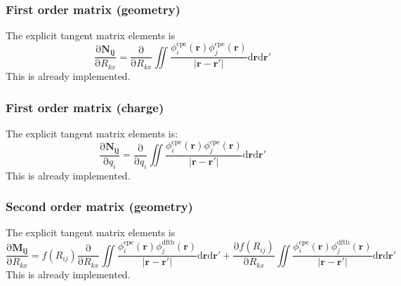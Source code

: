 \documentclass{article}
\numberwithin{equation}{section}
\begin{document}
\subsubsection{First order matrix (geometry)}
The explicit tangent matrix elements is
\begin{equation}
    \frac{\mathrm{\partial}\mathbf{N_{ij}}}{\mathrm{\partial}R_{kx}} =
    \frac{\mathrm{\partial}}{\mathrm{\partial}R_{kx}}  \iint \frac{\phi_i^\mathrm{cpe}\left(\mathbf{r}\right)\phi_j^\mathrm{cpe}\left(\mathbf{r}\right)}{\left| \mathbf{r} - \mathbf{r'}\right|} \mathrm{d}\mathbf{r}\mathrm{d}\mathbf{r'}
\end{equation}
This is already implemented.
\subsubsection{First order matrix (charge)}
The explicit tangent matrix elements is:
\begin{equation}
    \frac{\mathrm{\partial}\mathbf{N_{ij}}}{\mathrm{\partial}q_i} =
    \frac{\mathrm{\partial}}{\mathrm{\partial}q_i}  \iint \frac{\phi_i^\mathrm{cpe}\left(\mathbf{r}\right)\phi_j^\mathrm{cpe}\left(\mathbf{r}\right)}{\left| \mathbf{r} - \mathbf{r'}\right|} \mathrm{d}\mathbf{r}\mathrm{d}\mathbf{r'}
\end{equation}
This is already implemented.

\subsubsection{Second order matrix (geometry)}
The explicit tangent matrix elements is
\begin{equation}
    \frac{\mathrm{\partial}\mathbf{M_{ij}}}{\mathrm{\partial}R_{kx}} =
    f(R_{ij})\frac{\mathrm{\partial}}{\mathrm{\partial}R_{kx}}  \iint \frac{\phi_i^\mathrm{cpe}\left(\mathbf{r}\right)\phi_j^\mathrm{dftb}\left(\mathbf{r}\right)}{\left| \mathbf{r} - \mathbf{r'}\right|} \mathrm{d}\mathbf{r}\mathrm{d}\mathbf{r'}
    + \frac{\mathrm{\partial}f(R_{ij})}{\mathrm{\partial}R_{kx}}  \iint \frac{\phi_i^\mathrm{cpe}\left(\mathbf{r}\right)\phi_j^\mathrm{dftb}\left(\mathbf{r}\right)}{\left| \mathbf{r} - \mathbf{r'}\right|} \mathrm{d}\mathbf{r}\mathrm{d}\mathbf{r'}
\end{equation}
This is already implemented.
\end{document}
